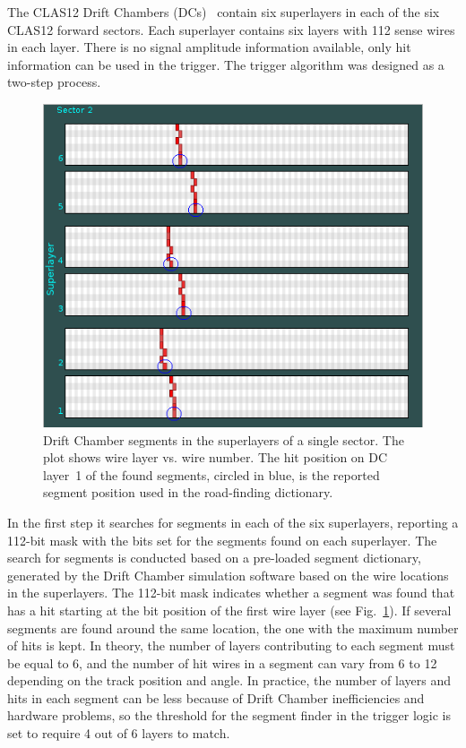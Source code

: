 The CLAS12 Drift Chambers (DCs)~\cite{dc-ref} contain six superlayers in each of the six CLAS12 forward
sectors. Each superlayer contains six layers with 112 sense wires in each layer. There is no signal amplitude
information available, only hit information can be used in the trigger. The trigger algorithm was designed as a
two-step process.

\begin{figure}[hbt]
	\centering
	\includegraphics[width=0.85\columnwidth,keepaspectratio]{img/dc_segments.png}
	\caption{Drift Chamber segments in the superlayers of a single sector. The plot shows wire layer vs.
          wire number. The hit position on DC layer~1 of the found segments, circled in blue, is the reported
          segment position used in the road-finding dictionary.}
	\label{fig:dc_segments}
\end{figure}

In the first step it searches for segments in each of the six superlayers, reporting a 112-bit mask with the
bits set for the segments found on each superlayer. The search for segments is conducted based on a
pre-loaded segment dictionary, generated by the Drift Chamber simulation software based on the wire
locations in the superlayers. The 112-bit mask indicates whether a segment was found that has a hit starting at
the bit position of the first wire layer (see Fig.~\ref{fig:dc_segments}). If several segments are found around
the same location, the one with the maximum number of hits is kept. In theory, the number of layers contributing
to each segment must be equal to 6, and the number of hit wires in a segment can vary from 6 to 12 depending on
the track position and angle. In practice, the number of layers and hits in each segment can be less because of
Drift Chamber inefficiencies and hardware problems, so the threshold for the segment finder in the trigger
logic is set to require 4 out of 6 layers to match.

